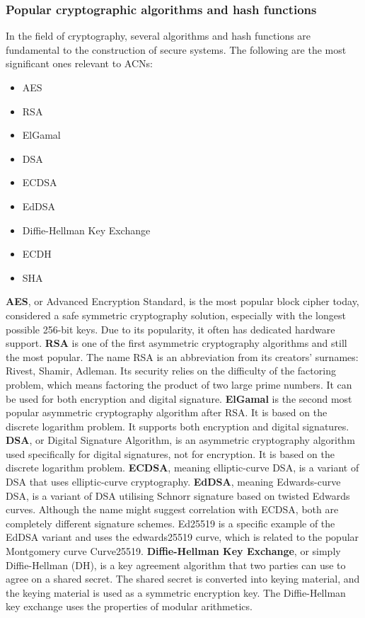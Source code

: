 \subsubsection{Popular cryptographic algorithms and hash functions}
In the field of cryptography, several algorithms and hash functions are fundamental to the construction of secure systems. The following are the most significant ones relevant to ACNs:
\begin{itemize}
\item AES
\item RSA
\item ElGamal
\item DSA
\item ECDSA
\item EdDSA
\item Diffie-Hellman Key Exchange
\item ECDH
\item SHA
\end{itemize}
\textbf{AES}, or Advanced Encryption Standard, is the most popular block cipher today, considered a safe symmetric cryptography solution, especially with the longest possible 256-bit keys. Due to its popularity, it often has dedicated hardware support.
\textbf{RSA} is one of the first asymmetric cryptography algorithms and still the most popular. The name RSA is an abbreviation from its creators' surnames: Rivest, Shamir, Adleman. Its security relies on the difficulty of the factoring problem, which means factoring the product of two large prime numbers. It can be used for both encryption and digital signature.
\textbf{ElGamal} is the second most popular asymmetric cryptography algorithm after RSA. It is based on the discrete logarithm problem. It supports both encryption and digital signatures.
\textbf{DSA}, or Digital Signature Algorithm, is an asymmetric cryptography algorithm used specifically for digital signatures, not for encryption. It is based on the discrete logarithm problem.
\textbf{ECDSA}, meaning elliptic-curve DSA, is a variant of DSA that uses elliptic-curve cryptography.
\textbf{EdDSA}, meaning Edwards-curve DSA, is a variant of DSA utilising Schnorr signature based on twisted Edwards curves. Although the name might suggest correlation with ECDSA, both are completely different signature schemes. Ed25519 is a specific example of the EdDSA variant and uses the edwards25519 curve, which is related to the popular Montgomery curve Curve25519. 
\textbf{Diffie-Hellman Key Exchange}, or simply Diffie-Hellman (DH), is a key agreement algorithm that two parties can use to agree on a shared secret. The shared secret is converted into keying material, and the keying material is used as a symmetric encryption key. The Diffie-Hellman key exchange uses the properties of modular arithmetics.
